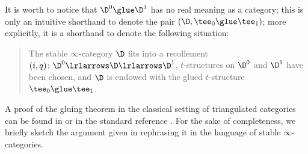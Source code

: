 \begin{notat}
\label{notat:recdec}
It is worth to notice that $\D^0\glue \D^1$ has no real meaning as a category; this is only an intuitive shorthand to denote the pair $(\D,\tee_0\glue\tee_1)$; \marginnote{\dbend} more explicitly, it is a shorthand to denote the following situation:
\begin{quote}
The stable $\infty$-category $\D$ fits into a recollement $(i,q)\colon \D^0\lrlarrows \D \lrlarrows \D^1$, $t$-structures on $\D^0$ and $\D^1$ have been chosen, and $\D$ is endowed with the glued $t$-structure $\tee_0\glue \tee_1$.
\end{quote}
\end{notat}
A proof of the gluing theorem in the classical setting of triangulated categories can be found in \cite[Thm. \textbf{7.2.2}]{Banagl} or in the standard reference \cite{BBDPervers}. For the sake of completeness, we briefly sketch the argument given in \cite{Banagl} rephrasing it in the language of stable $\infty$-categories.
